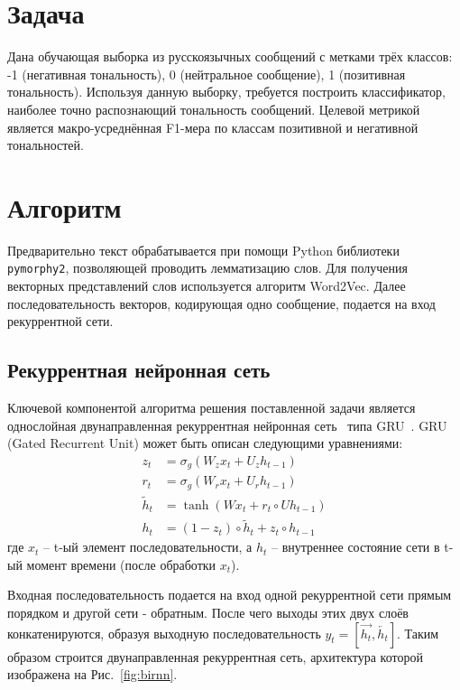 \documentclass[12pt]{article}
\newcommand{\ENGLISH}[1]{#1}
\begin{document}
\section{Задача}
Дана обучающая выборка из русскоязычных сообщений с метками трёх классов: -1 (негативная тональность), 0 (нейтральное сообщение), 1 (позитивная тональность). Используя данную выборку, требуется построить классификатор, наиболее точно распознающий тональность сообщений. Целевой метрикой является макро-усреднённая F1-мера по классам позитивной и негативной тональностей.

\section{Алгоритм}
Предварительно текст обрабатывается при помощи Python библиотеки \ENGLISH{\texttt{pymorphy2}}, позволяющей проводить лемматизацию слов. Для получения векторных представлений слов используется алгоритм Word2Vec. Далее последовательность векторов, кодирующая одно сообщение, подается на вход рекуррентной сети.

\subsection{Рекуррентная нейронная сеть}
Ключевой компонентой алгоритма решения поставленной задачи является однослойная двунаправленная рекуррентная нейронная сеть~\cite{schuster} типа GRU~\cite{cho}. GRU (Gated Recurrent Unit) может быть описан следующими уравнениями:
	\begin{align}
	z_{t}&=\sigma_{g}(W_{z}x_{t}+U_{z}h_{t-1})\\
	r_{t}&=\sigma_{g}(W_{r}x_{t}+U_{r}h_{t-1})\\
	\tilde{h}_{t}&=\tanh(Wx_{t}+r_{t}\circ Uh_{t-1})\\
	h_{t}&=(1-z_{t})\circ \tilde{h}_{t}+z_{t}\circ h_{t-1}
	\end{align}	
где $x_{t}$ -- t-ый элемент последовательности, а $h_{t}$ -- внутреннее состояние сети в t-ый момент времени (после обработки $x_{t}$).

Входная последовательность подается на вход одной рекуррентной сети прямым порядком и другой сети - обратным. После чего выходы этих двух слоёв конкатенируются, образуя выходную последовательность $y_{t} = \left[\overrightarrow{h_{t}},\overleftarrow{h_{t}}\right]$. Таким образом строится двунаправленная рекуррентная сеть, архитектура которой изображена на Рис.~\ref{fig:birnn}.
\end{document}
